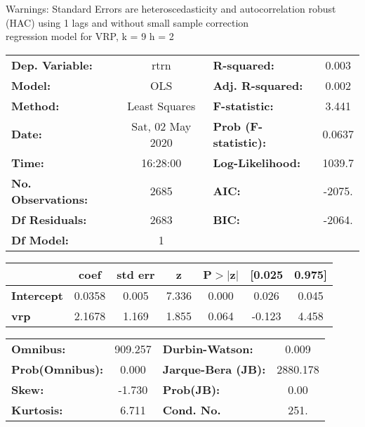 Warnings: \newline
 [1] Standard Errors are heteroscedasticity and autocorrelation robust (HAC) using 1 lags and without small sample correction\\ 

regression model for VRP, k = 9 h = 2\begin{center}
\begin{tabular}{lclc}
\toprule
\textbf{Dep. Variable:}    &       rtrn       & \textbf{  R-squared:         } &     0.003   \\
\textbf{Model:}            &       OLS        & \textbf{  Adj. R-squared:    } &     0.002   \\
\textbf{Method:}           &  Least Squares   & \textbf{  F-statistic:       } &     3.441   \\
\textbf{Date:}             & Sat, 02 May 2020 & \textbf{  Prob (F-statistic):} &   0.0637    \\
\textbf{Time:}             &     16:28:00     & \textbf{  Log-Likelihood:    } &    1039.7   \\
\textbf{No. Observations:} &        2685      & \textbf{  AIC:               } &    -2075.   \\
\textbf{Df Residuals:}     &        2683      & \textbf{  BIC:               } &    -2064.   \\
\textbf{Df Model:}         &           1      & \textbf{                     } &             \\
\bottomrule
\end{tabular}
\begin{tabular}{lcccccc}
                   & \textbf{coef} & \textbf{std err} & \textbf{z} & \textbf{P$> |$z$|$} & \textbf{[0.025} & \textbf{0.975]}  \\
\midrule
\textbf{Intercept} &       0.0358  &        0.005     &     7.336  &         0.000        &        0.026    &        0.045     \\
\textbf{vrp}       &       2.1678  &        1.169     &     1.855  &         0.064        &       -0.123    &        4.458     \\
\bottomrule
\end{tabular}
\begin{tabular}{lclc}
\textbf{Omnibus:}       & 909.257 & \textbf{  Durbin-Watson:     } &    0.009  \\
\textbf{Prob(Omnibus):} &   0.000 & \textbf{  Jarque-Bera (JB):  } & 2880.178  \\
\textbf{Skew:}          &  -1.730 & \textbf{  Prob(JB):          } &     0.00  \\
\textbf{Kurtosis:}      &   6.711 & \textbf{  Cond. No.          } &     251.  \\
\bottomrule
\end{tabular}
\end{center}

